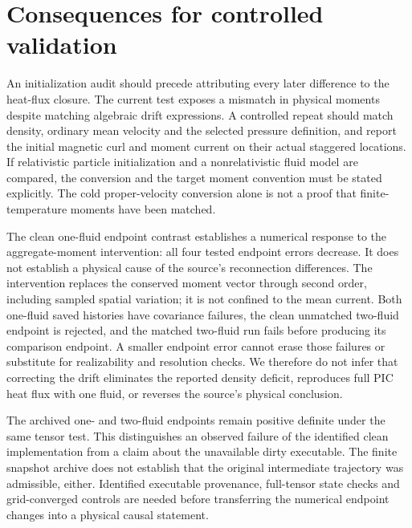 \section{Consequences for controlled validation}
\label{sec:discussion}
An initialization audit should precede attributing every later difference to
the heat-flux closure. The current test exposes a mismatch in physical moments
despite matching algebraic drift expressions. A controlled repeat should match
density, ordinary mean velocity and the selected pressure definition, and
report the initial magnetic curl and moment current on their actual staggered
locations. If relativistic particle initialization and a nonrelativistic fluid
model are compared, the conversion and the target moment convention must be
stated explicitly. The cold proper-velocity conversion alone is not a proof
that finite-temperature moments have been matched.

The clean one-fluid endpoint contrast establishes a numerical response to
the aggregate-moment intervention: all four tested endpoint errors decrease.
It does not establish a physical cause of the source's reconnection differences.
The intervention replaces the conserved moment vector through second order,
including sampled spatial variation; it is not confined to the mean current.
Both one-fluid saved histories have covariance
failures, the clean unmatched two-fluid endpoint is rejected, and the matched
two-fluid run fails before producing its comparison endpoint. A smaller
endpoint error cannot erase those failures or substitute for realizability
and resolution checks. We therefore do not infer that correcting the drift
eliminates the reported density deficit, reproduces full PIC heat flux with
one fluid, or reverses the source's physical conclusion.

The archived one- and two-fluid endpoints remain positive definite under
the same tensor test. This distinguishes an observed failure of the identified
clean implementation from a claim about the unavailable dirty executable.
The finite snapshot archive does not establish that the original intermediate
trajectory was admissible, either. Identified executable provenance, full-tensor
state checks and grid-converged controls are needed before transferring the
numerical endpoint changes into a physical causal statement.

